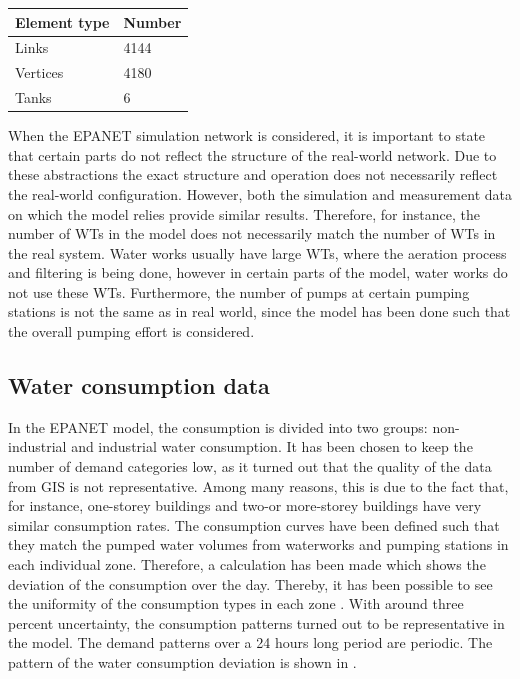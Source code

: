 \begin{center}
\label{numberofelements_table}
    \begin{tabular}{ | p{3cm} | p{3cm} |}
    \hline
    \textbf{Element type} & \textbf{Number}  \\ 
    \hline
    Links & 4144  \\ 
    \hline
    Vertices & 4180  \\ 
    \hline
    Tanks & 6  \\ 
    \hline
    \end{tabular}
\end{center}

\vspace{-3mm}

When the EPANET simulation network is considered, it is important to state that certain parts do not reflect the structure of the real-world network. Due to these abstractions the exact structure and operation does not necessarily reflect the real-world configuration. However, both the simulation and measurement data on which the model relies provide similar results. Therefore, for instance, the number of WTs in the model does not necessarily match the number of WTs in the real system. Water works usually have large WTs, where the aeration process and filtering is being done, however in certain parts of the model, water works do not use these WTs. Furthermore, the number of pumps at certain pumping stations is not the same as in real world, since the model has been done such that the overall pumping effort is considered.  

\subsection{Water consumption data}
\label{water_consumption_data}

In the EPANET model, the consumption is divided into two groups: non-industrial and industrial water consumption. It has been chosen to keep the number of demand categories low, as it turned out that the quality of the data from GIS is not representative. Among many reasons, this is due to the fact that, for instance, one-storey buildings and two-or more-storey buildings have very similar consumption rates. The consumption curves have been defined such that they match the pumped water volumes from waterworks and pumping stations in each individual zone. Therefore, a calculation has been made which shows the deviation of the consumption over the day. Thereby, it has been possible to see the uniformity of the consumption types in each zone \cite{verdo_doc}. With around three percent uncertainty, the consumption patterns turned out to be representative in the model. The demand patterns over a 24 hours long period are periodic. The pattern of the water consumption deviation is shown in  .

